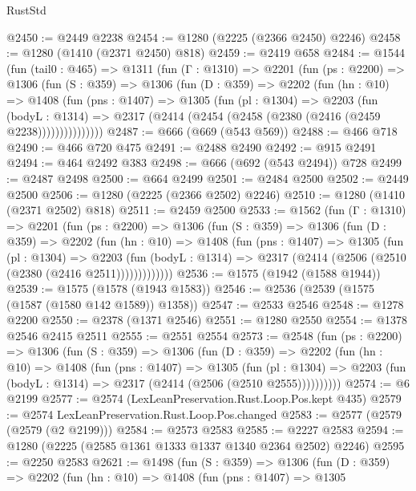 \begin{lexlean}{RustStd}
\begin{coremodule}
@2450 := @2449 @2238
@2454 := @1280 (@2225 (@2366 @2450) @2246)
@2458 := @1280 (@1410 (@2371 @2450) @818)
@2459 := @2419 @658
@2484 := @1544
    (fun (tail0 : @465) =>
    @1311
      (fun (Γ : @1310) =>
      @2201
        (fun (ps : @2200) =>
        @1306
          (fun (S : @359) =>
          @1306
            (fun (D : @359) =>
            @2202
              (fun (hn : @10) =>
              @1408
                (fun (pns : @1407) =>
                @1305
                  (fun (pl : @1304) =>
                  @2203
                    (fun (bodyL : @1314) =>
                    @2317 (@2414 (@2454 (@2458 (@2380 (@2416 (@2459 @2238)))))))))))))))
@2487 := @666 (@669 (@543 @569))
@2488 := @466 @718
@2490 := @466 @720 @475
@2491 := @2488 @2490
@2492 := @915 @2491
@2494 := @464 @2492 @383
@2498 := @666 (@692 (@543 @2494)) @728
@2499 := @2487 @2498
@2500 := @664 @2499
@2501 := @2484 @2500
@2502 := @2449 @2500
@2506 := @1280 (@2225 (@2366 @2502) @2246)
@2510 := @1280 (@1410 (@2371 @2502) @818)
@2511 := @2459 @2500
@2533 := @1562
    (fun (Γ : @1310) =>
    @2201
      (fun (ps : @2200) =>
      @1306
        (fun (S : @359) =>
        @1306
          (fun (D : @359) =>
          @2202
            (fun (hn : @10) =>
            @1408
              (fun (pns : @1407) =>
              @1305
                (fun (pl : @1304) =>
                @2203
                  (fun (bodyL : @1314) =>
                  @2317 (@2414 (@2506 (@2510 (@2380 (@2416 @2511)))))))))))))
@2536 := @1575 (@1942 (@1588 @1944))
@2539 := @1575 (@1578 (@1943 @1583))
@2546 := @2536 (@2539 (@1575 (@1587 (@1580 @142 @1589)) @1358))
@2547 := @2533 @2546
@2548 := @1278 @2200
@2550 := @2378 (@1371 @2546)
@2551 := @1280 @2550
@2554 := @1378 @2546 @2415 @2511
@2555 := @2551 @2554
@2573 := @2548
    (fun (ps : @2200) =>
    @1306
      (fun (S : @359) =>
      @1306
        (fun (D : @359) =>
        @2202
          (fun (hn : @10) =>
          @1408
            (fun (pns : @1407) =>
            @1305
              (fun (pl : @1304) =>
              @2203 (fun (bodyL : @1314) => @2317 (@2414 (@2506 (@2510 @2555))))))))))
@2574 := @6 @2199
@2577 := @2574 (LexLeanPreservation.Rust.Loop.Pos.kept @435)
@2579 := @2574 LexLeanPreservation.Rust.Loop.Pos.changed
@2583 := @2577 (@2579 (@2579 (@2 @2199)))
@2584 := @2573 @2583
@2585 := @2227 @2583
@2594 := @1280 (@2225 (@2585 @1361 @1333 @1337 @1340 @2364 @2502) @2246)
@2595 := @2250 @2583
@2621 := @1498
    (fun (S : @359) =>
    @1306
      (fun (D : @359) =>
      @2202
        (fun (hn : @10) =>
        @1408
          (fun (pns : @1407) =>
          @1305

\end{coremodule}
\end{lexlean}
